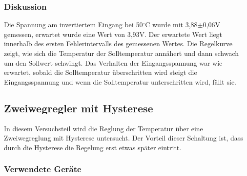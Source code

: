 \documentclass[12pt,a4paper]{article}
\begin{document}
\subsubsection*{Diskussion}
Die Spannung am invertiertem Eingang bei 50$^\circ$C wurde mit 3,88$\pm$0,06V gemessen, erwartet wurde eine Wert von 3,93V. Der erwartete Wert liegt innerhalb des ersten Fehlerintervalls des gemessenen Wertes. Die Regelkurve zeigt, wie sich die Temperatur der Solltemperatur annähert und dann schwach um den Sollwert schwingt. Das Verhalten der Eingangsspannung war wie erwartet, sobald die Solltemperatur überschritten wird steigt die Eingangsspannung und wenn die Solltemperatur unterschritten wird, fällt sie.



\subsection{Zweiwegregler mit Hysterese}

In diesem Versuchsteil wird die Reglung der Temperatur über eine Zweiwegreglung mit Hysterese untersucht. Der Vorteil dieser Schaltung ist, dass durch die Hysterese die Regelung erst etwas später eintritt.

\subsubsection*{Verwendete Geräte}
\end{document}

